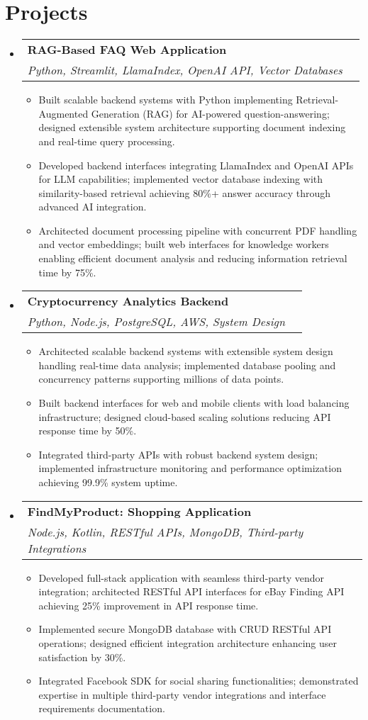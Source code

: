 \documentclass[letterpaper,10pt]{article}
\makeatletter
\newcommand{\resumeItem}[1]{
  \item\small{
    {#1 \vspace{-2pt}}
  }
}
\newcommand{\resumeSubheading}[4]{
  \vspace{-2pt}\item
    \begin{tabular*}{1.0\textwidth}[t]{l@{\extracolsep{\fill}}r}
      \textbf{#1} & \textbf{\small #2} \\
      \textit{\small#3} & \textit{\small #4} \\
    \end{tabular*}\vspace{-7pt}
}
\newcommand{\resumeSubHeadingListStart}{\begin{itemize}[leftmargin=0.15in, label={}]}
\newcommand{\resumeSubHeadingListEnd}{\end{itemize}}
\newcommand{\resumeItemListStart}{\begin{itemize}[leftmargin=*, itemsep=-1pt]}
\newcommand{\resumeItemListEnd}{\end{itemize}\vspace{-5pt}}
\makeatother
\begin{document}
\section{Projects}
\resumeSubHeadingListStart
  \resumeSubheading
    {RAG-Based FAQ Web Application}{}
    {Python, Streamlit, LlamaIndex, OpenAI API, Vector Databases}{}
    \resumeItemListStart
      \resumeItem{Built scalable backend systems with Python implementing Retrieval-Augmented Generation (RAG) for AI-powered question-answering; designed extensible system architecture supporting document indexing and real-time query processing.}
      \resumeItem{Developed backend interfaces integrating LlamaIndex and OpenAI APIs for LLM capabilities; implemented vector database indexing with similarity-based retrieval achieving 80\%+ answer accuracy through advanced AI integration.}
      \resumeItem{Architected document processing pipeline with concurrent PDF handling and vector embeddings; built web interfaces for knowledge workers enabling efficient document analysis and reducing information retrieval time by 75\%.}
    \resumeItemListEnd
\vspace{-14pt}
  \resumeSubheading
    {Cryptocurrency Analytics Backend}{}
    {Python, Node.js, PostgreSQL, AWS, System Design}{}
    \resumeItemListStart
      \resumeItem{Architected scalable backend systems with extensible system design handling real-time data analysis; implemented database pooling and concurrency patterns supporting millions of data points.}
      \resumeItem{Built backend interfaces for web and mobile clients with load balancing infrastructure; designed cloud-based scaling solutions reducing API response time by 50\%.}
      \resumeItem{Integrated third-party APIs with robust backend system design; implemented infrastructure monitoring and performance optimization achieving 99.9\% system uptime.}
    \resumeItemListEnd
\vspace{-14pt}
  \resumeSubheading
    {FindMyProduct: Shopping Application}{}
    {Node.js, Kotlin, RESTful APIs, MongoDB, Third-party Integrations}{}
    \resumeItemListStart
      \resumeItem{Developed full-stack application with seamless third-party vendor integration; architected RESTful API interfaces for eBay Finding API achieving 25\% improvement in API response time.}
      \resumeItem{Implemented secure MongoDB database with CRUD RESTful API operations; designed efficient integration architecture enhancing user satisfaction by 30\%.}
      \resumeItem{Integrated Facebook SDK for social sharing functionalities; demonstrated expertise in multiple third-party vendor integrations and interface requirements documentation.}
    \resumeItemListEnd
\resumeSubHeadingListEnd
\vspace{-11pt}
\end{document}
